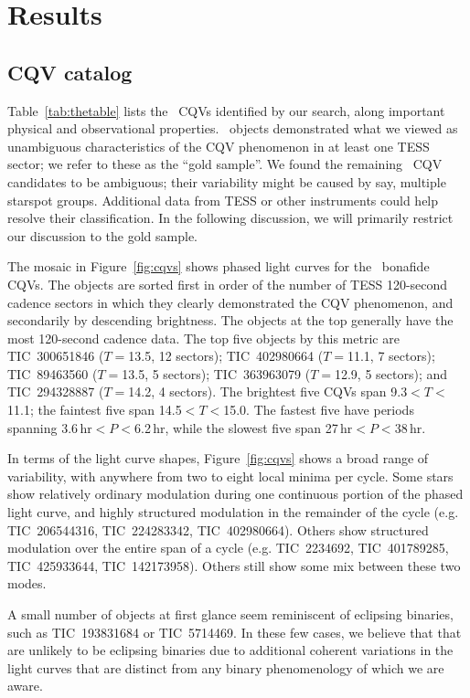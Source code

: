 \documentclass[11pt,twocolumn,tighten]{aastex63}
\begin{document}
\section{Results}
\label{sec:results}

\subsection{CQV catalog}
\label{sec:catalog}

Table~\ref{tab:thetable} lists the \ncpvsfound\ CQVs identified by our
search, along important physical and observational properties.
\ngoods\ objects demonstrated what we viewed as unambiguous
characteristics of the CQV phenomenon in at least one TESS sector;
we refer to these as the ``gold sample''.  We found the remaining \nmaybes\ CQV
candidates to be ambiguous; their variability might
be caused by say, multiple starspot groups.  Additional data from TESS
or other instruments could help resolve their classification.  In the
following discussion, we will primarily restrict our discussion to the 
gold sample.

The mosaic in Figure~\ref{fig:cqvs} shows phased light curves
for the \ngoods\ bonafide CQVs.  The objects are sorted first in order
of the number of TESS 120-second cadence sectors in which they clearly
demonstrated the CQV phenomenon, and secondarily by descending
brightness.  The objects at the top generally have the most 120-second
cadence data.  The top five objects by this metric are TIC~300651846
($T$$=$13.5, 12 sectors); TIC~402980664 ($T$$=$11.1, 7 sectors);
TIC~89463560 ($T$$=$13.5, 5 sectors); TIC~363963079 ($T$$=$12.9, 5
sectors); and TIC~294328887 ($T$$=$14.2, 4 sectors).  The brightest
five CQVs span 9.3$<$$T$$<$11.1; the faintest five span
14.5$<$$T$$<$15.0.  The fastest five have periods spanning
3.6\,hr$<$$P$$<$6.2\,hr, while the slowest five span
27\,hr$<$$P$$<$38\,hr.

In terms of the light curve shapes, Figure~\ref{fig:cqvs}
shows a broad range of variability, with anywhere from two to eight
local minima per cycle.  Some stars show relatively ordinary
modulation during one continuous portion of the phased light curve,
and highly structured modulation in the remainder of the cycle (e.g.
TIC~206544316, TIC~224283342, TIC~402980664).  Others show structured
modulation over the entire span of a cycle (e.g. TIC~2234692,
TIC~401789285, TIC~425933644, TIC~142173958).  Others still show some
mix between these two modes.

A small number of objects at first glance seem reminiscent of
eclipsing binaries, such as TIC~193831684 or TIC~5714469.  In these
few cases, we believe that that are unlikely to be eclipsing binaries
due to additional coherent variations in the light curves that are
distinct from any binary phenomenology of which we are aware.
\end{document}
